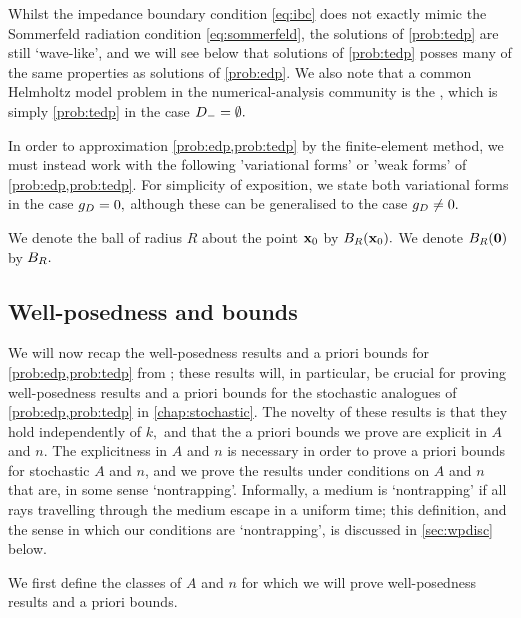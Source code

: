 Whilst the impedance boundary condition \eqref{eq:ibc} does not exactly mimic the Sommerfeld radiation condition \eqref{eq:sommerfeld}, the solutions of \cref{prob:tedp} are still `wave-like', and we will see below that solutions of \cref{prob:tedp} posses many of the same properties as solutions of \cref{prob:edp}. We also note that a common Helmholtz model problem in the numerical-analysis community is the , which is simply \cref{prob:tedp} in the case $D_{-} = \emptyset.$

In order to approximation \cref{prob:edp,prob:tedp} by the finite-element method, we must instead work with the following 'variational forms' or 'weak forms' of \cref{prob:edp,prob:tedp}. For simplicity of exposition, we state both variational forms in the case $g_{D} = 0,$ although these can be generalised to the case $g_{D} \neq 0.$

We denote the ball of radius $R$ about the point $\mathbf{x}_{0}$ by $\Ball{R}{\bxz}.$ We denote $\Ball{R}{\bfzero}$ by $B_{R}.$


  \subsection{Well-posedness and bounds}\label{sec:wpbounds}

  We will now recap the well-posedness results and a priori bounds for \cref{prob:edp,prob:tedp} from \cite{GrPeSp:19}; these results will, in particular, be crucial for proving well-posedness results and a priori bounds for the stochastic analogues of \cref{prob:edp,prob:tedp} in \cref{chap:stochastic}. The novelty of these results is that they hold independently of $k,$ and that the a priori bounds we prove are explicit in $A$ and $n$. The explicitness in $A$ and $n$ is necessary in order to prove a priori bounds for stochastic $A$ and $n$, and we prove the results under conditions on $A$ and $n$ that are, in some sense `nontrapping'. Informally, a medium is `nontrapping' if all rays travelling through the medium escape in a uniform time; this definition, and the sense in which our conditions are `nontrapping', is discussed in \cref{sec:wpdisc} below.

  We first define the classes of $A$ and $n$ for which we will prove well-posedness results and a priori bounds.%


